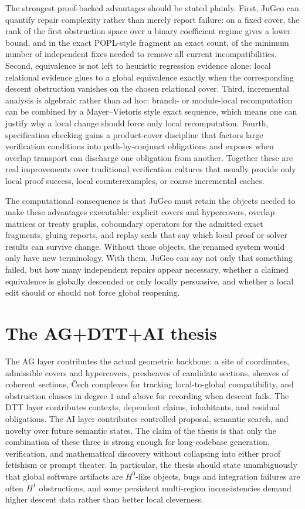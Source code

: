 \documentclass[11pt]{report}
\begin{document}
The strongest proof-backed advantages should be stated plainly. First, JuGeo can quantify repair complexity rather than merely report failure: on a fixed cover, the rank of the first obstruction space over a binary coefficient regime gives a lower bound, and in the exact POPL-style fragment an exact count, of the minimum number of independent fixes needed to remove all current incompatibilities. Second, equivalence is not left to heuristic regression evidence alone: local relational evidence glues to a global equivalence exactly when the corresponding descent obstruction vanishes on the chosen relational cover. Third, incremental analysis is algebraic rather than ad hoc: branch- or module-local recomputation can be combined by a Mayer--Vietoris style exact sequence, which means one can justify why a local change should force only local recomputation. Fourth, specification checking gains a product-cover discipline that factors large verification conditions into path-by-conjunct obligations and exposes when overlap transport can discharge one obligation from another. Together these are real improvements over traditional verification cultures that usually provide only local proof success, local counterexamples, or coarse incremental caches.

The computational consequence is that JuGeo must retain the objects needed to make these advantages executable: explicit covers and hypercovers, overlap matrices or treaty graphs, coboundary operators for the admitted exact fragments, gluing reports, and replay seals that say which local proof or solver results can survive change. Without those objects, the renamed system would only have new terminology. With them, JuGeo can say not only that something failed, but how many independent repairs appear necessary, whether a claimed equivalence is globally descended or only locally persuasive, and whether a local edit should or should not force global reopening.

\section{The AG+DTT+AI thesis}
The AG layer contributes the actual geometric backbone: a site of coordinates, admissible covers and hypercovers, presheaves of candidate sections, sheaves of coherent sections, \v{C}ech complexes for tracking local-to-global compatibility, and obstruction classes in degree $1$ and above for recording when descent fails. The DTT layer contributes contexts, dependent claims, inhabitants, and residual obligations. The AI layer contributes controlled proposal, semantic search, and novelty over future semantic states. The claim of the thesis is that only the combination of these three is strong enough for long-codebase generation, verification, and mathematical discovery without collapsing into either proof fetishism or prompt theater. In particular, the thesis should state unambiguously that global software artifacts are $H^0$-like objects, bugs and integration failures are often $H^1$ obstructions, and some persistent multi-region inconsistencies demand higher descent data rather than better local cleverness.
\end{document}
